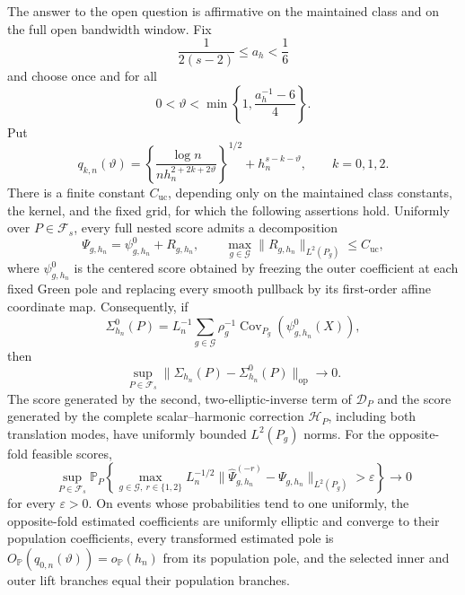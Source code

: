The answer to the open question is affirmative on the maintained class and on the full open bandwidth window.  Fix
\[
 \frac{1}{2(s-2)}\leq a_h<\frac16
\]
and choose once and for all
\[
 0<\vartheta<\min\left\{1,\frac{a_h^{-1}-6}{4}\right\}.
\]
Put
\[
 q_{k,n}(\vartheta)=
 \left\{\frac{\log n}{n h_n^{2+2k+2\vartheta}}\right\}^{1/2}
 +h_n^{s-k-\vartheta},\qquad k=0,1,2.
\]
There is a finite constant \(C_{\mathrm{uc}}\), depending only on the maintained class constants, the kernel, and the fixed grid, for which the following assertions hold.
Uniformly over \(P\in\mathcal F_s\), every full nested score admits a decomposition
\[
 \Psi_{g,h_n}=\psi^0_{g,h_n}+R_{g,h_n},
 \qquad
 \max_{g\in\mathcal G}\lVert R_{g,h_n}\rVert_{L^2(P_g)}\leq C_{\mathrm{uc}},
\]
where \(\psi^0_{g,h_n}\) is the centered score obtained by freezing the outer coefficient at each fixed Green pole and replacing every smooth pullback by its first-order affine coordinate map.  Consequently, if
\[
 \Sigma^0_{h_n}(P)=L_n^{-1}
 \sum_{g\in\mathcal G}\rho_g^{-1}
 \operatorname{Cov}_{P_g}(\psi^0_{g,h_n}(X)),
\]
then
\[
 \sup_{P\in\mathcal F_s}
 \lVert\Sigma_{h_n}(P)-\Sigma^0_{h_n}(P)\rVert_{\mathrm{op}}
 \longrightarrow0.
\]
The score generated by the second, two-elliptic-inverse term of \(\mathcal D_P\) and the score generated by the complete scalar--harmonic correction \(\mathcal H_P\), including both translation modes, have uniformly bounded \(L^2(P_g)\) norms.  For the opposite-fold feasible scores,
\[
 \sup_{P\in\mathcal F_s}\mathbb P_P\!\left\{
 \max_{g\in\mathcal G,\ r\in\{1,2\}}
 L_n^{-1/2}
 \lVert\widehat\Psi_{g,h_n}^{(-r)}-\Psi_{g,h_n}\rVert_{L^2(P_g)}
 >\varepsilon\right\}\longrightarrow0
\]
for every \(\varepsilon>0\).  On events whose probabilities tend to one uniformly, the opposite-fold estimated coefficients are uniformly elliptic and converge to their population coefficients, every transformed estimated pole is \(O_{\mathbb P}(q_{0,n}(\vartheta))=o_{\mathbb P}(h_n)\) from its population pole, and the selected inner and outer lift branches equal their population branches.


